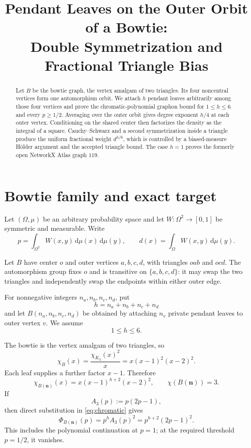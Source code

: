 \documentclass[11pt]{article}
\title{Pendant Leaves on the Outer Orbit of a Bowtie:\\
Double Symmetrization and Fractional Triangle Bias}
\author{}
\date{}
\newcommand{\dd}{\,\mathrm d}
\begin{document}
\maketitle

\begin{abstract}
Let $B$ be the bowtie graph, the vertex amalgam of two triangles.  Its four
noncentral vertices form one automorphism orbit.  We attach $h$ pendant
leaves arbitrarily among those four vertices and prove the
chromatic-polynomial graphon bound for $1\leq h\leq6$ and every
$p\geq1/2$.  Averaging over the outer orbit gives degree exponent $h/4$ at
each outer vertex.  Conditioning on the shared center then factorizes the
density as the integral of a square.  Cauchy--Schwarz and a second
symmetrization inside a triangle produce the uniform fractional weight
$d^{h/6}$, which is controlled by a biased-measure H\"older argument and the
accepted triangle bound.  The case $h=1$ proves the formerly open NetworkX
Atlas graph $119$.
\end{abstract}


\section{Bowtie family and exact target}

Let $(\Omega,\mu)$ be an arbitrary probability space and let
$W\colon\Omega^2\to[0,1]$ be symmetric and measurable.  Write
\[
 p=\int_{\Omega^2}W(x,y)\dd\mu(x)\dd\mu(y),
 \qquad
 d(x)=\int_\Omega W(x,y)\dd\mu(y).
\]

Let $B$ have center $o$ and outer vertices $a,b,c,d$, with triangles
$oab$ and $ocd$.  The automorphism group fixes $o$ and is transitive on
$\{a,b,c,d\}$: it may swap the two triangles and independently swap the
endpoints within either outer edge.

For nonnegative integers $n_a,n_b,n_c,n_d$, put
\[
 h=n_a+n_b+n_c+n_d
\]
and let $B(n_a,n_b,n_c,n_d)$ be obtained by attaching $n_v$ private
pendant leaves to outer vertex $v$.  We assume
\[
 1\leq h\leq6.
\]

The bowtie is the vertex amalgam of two triangles, so
\[
 \chi_B(x)=\frac{\chi_{K_3}(x)^2}{x}
 =x(x-1)^2(x-2)^2.
\]
Each leaf supplies a further factor $x-1$.  Therefore
\begin{equation}
 \chi_{B(\boldsymbol n)}(x)
 =x(x-1)^{h+2}(x-2)^2,
 \qquad \chi(B(\boldsymbol n))=3.
 \label{eq:chromatic}
\end{equation}
If
\[
 A_3(p):=p(2p-1),
\]
then direct substitution in \eqref{eq:chromatic} gives
\begin{equation}
 \Phi_{B(\boldsymbol n)}(p)
 =p^hA_3(p)^2
 =p^{h+2}(2p-1)^2.
 \label{eq:target}
\end{equation}
This includes the polynomial continuation at $p=1$; at the required
threshold $p=1/2$, it vanishes.
\end{document}
